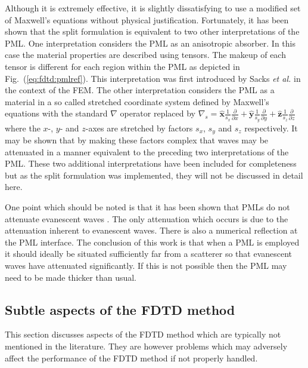 \documentclass[a4paper, 12pt]{article}
\newcommand{\rfig}[1]{Fig.\ (\ref{#1})}
\begin{document}
	Although it is extremely effective, it is slightly dissatisfying to use
	a modified set of Maxwell's equations without physical
	justification. Fortunately, it has been shown that the split
	formulation is equivalent to two other interpretations of the PML. One
	interpretation considers the PML as an anisotropic absorber. In this
	case the material properties are described using tensors. The makeup
	of each tensor is different for each region within the PML as depicted
	in \rfig{eq:fdtd:pmlref}. This interpretation was first introduced by
	Sacks \emph{et al.} \cite{sacks95ieeetransantprop} in the context of the FEM. The other interpretation considers the
	PML as a material in a so called stretched coordinate system
	defined by Maxwell's equations with the standard $\nabla$ operator
	replaced by 
	$\nabla_s=\hat{\mathbf{x}}\frac{1}{s_x}\frac{\partial}{\partial
		x}+\hat{\mathbf{y}}\frac{1}{s_y}\frac{\partial}{\partial
		y}+\hat{\mathbf{z}}\frac{1}{s_z}\frac{\partial}{\partial z}$
	\cite{jin02book} where
	the $x$-, $y$- and $z$-axes are stretched by factors $s_x$, $s_y$ and
	$s_z$ respectively. It may be shown that by making these factors
	complex that waves may be attenuated in a manner equivalent to the
	preceding two interpretations of the PML. These two additional
	interpretations have been included for completeness but as the split
	formulation was implemented, they will not be discussed in detail
	here. 
	
	One point which should be noted is that it has been shown that PMLs do
	not attenuate evanescent waves
	\cite{moerloose95ieeemicguidwavlet,berenger99ieeetransantprop1497,berenger00intjournnummodel}.
	The only attenuation which occurs is due to the attenuation inherent
	to evanescent waves. There is also a numerical reflection at the PML
	interface. The conclusion of this work is that when a PML is employed
	it should ideally be situated sufficiently far from a scatterer so that
	evanescent waves have attenuated significantly. If this is not
	possible then the PML may need to be made thicker than usual.
	
	\subsection{Subtle aspects of the FDTD method}
	This section discusses aspects of the FDTD method which are typically not
	mentioned in the literature. They are however problems which may
	adversely affect the performance of the FDTD method if not properly
	handled.
\end{document}
